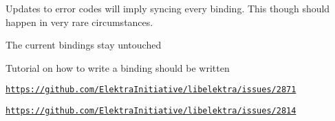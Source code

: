 \begin{DoxyItemize}
\item Updates to error codes will imply syncing every binding. This though should happen in very rare circumstances.
\end{DoxyItemize}


\begin{DoxyItemize}
\item The current bindings stay untouched
\item Tutorial on how to write a binding should be written
\end{DoxyItemize}


\begin{DoxyItemize}
\item \href{https://github.com/ElektraInitiative/libelektra/issues/2871}{\tt https\+://github.\+com/\+Elektra\+Initiative/libelektra/issues/2871}
\item \href{https://github.com/ElektraInitiative/libelektra/issues/2814}{\tt https\+://github.\+com/\+Elektra\+Initiative/libelektra/issues/2814} 
\end{DoxyItemize}